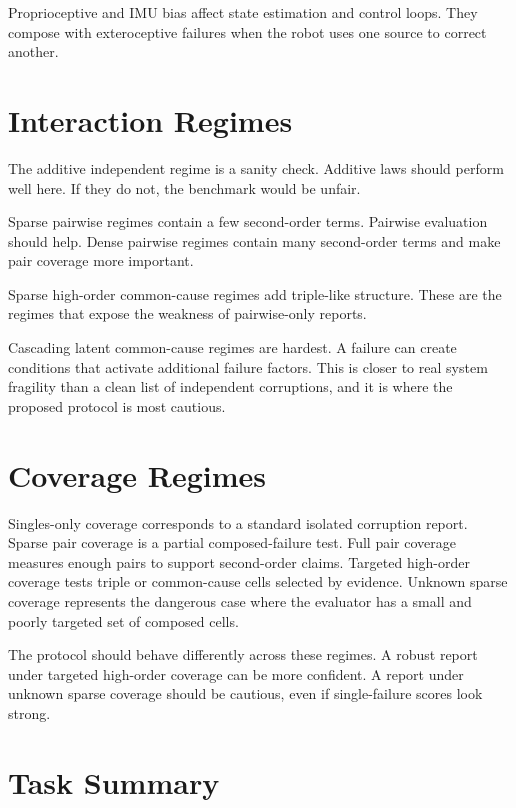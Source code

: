 \documentclass{article}
\begin{document}
Proprioceptive and IMU bias affect state estimation and control loops. They compose with exteroceptive failures when the robot uses one source to correct another.

\section{Interaction Regimes}

The additive independent regime is a sanity check. Additive laws should perform well here. If they do not, the benchmark would be unfair.

Sparse pairwise regimes contain a few second-order terms. Pairwise evaluation should help. Dense pairwise regimes contain many second-order terms and make pair coverage more important.

Sparse high-order common-cause regimes add triple-like structure. These are the regimes that expose the weakness of pairwise-only reports.

Cascading latent common-cause regimes are hardest. A failure can create conditions that activate additional failure factors. This is closer to real system fragility than a clean list of independent corruptions, and it is where the proposed protocol is most cautious.

\section{Coverage Regimes}

Singles-only coverage corresponds to a standard isolated corruption report. Sparse pair coverage is a partial composed-failure test. Full pair coverage measures enough pairs to support second-order claims. Targeted high-order coverage tests triple or common-cause cells selected by evidence. Unknown sparse coverage represents the dangerous case where the evaluator has a small and poorly targeted set of composed cells.

The protocol should behave differently across these regimes. A robust report under targeted high-order coverage can be more confident. A report under unknown sparse coverage should be cautious, even if single-failure scores look strong.

\section{Task Summary}
\label{app:task}

\begin{table}[t]
\centering
\caption{Task-family summary for the order-calibrated protocol.}
\resizebox{\linewidth}{!}{}
\end{table}
\end{document}
